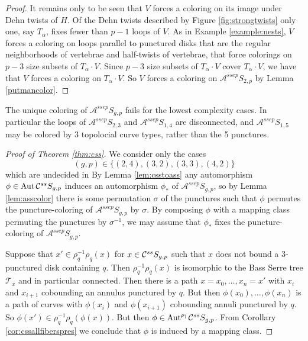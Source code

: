 \begin{proof}
It remains only to be seen that $V$ forces a coloring on its image under Dehn twists of $H$.
Of the Dehn twists described by Figure \ref{fig:strongtwists}
only one, say $T_\alpha$, fixes fewer than $p-1$ loops of $V$.
As in Example \ref{example:nests}, $V$ forces a coloring on loops parallel to punctured
disks that are the regular neighborhoods of vertebrae and half-twists of vertebrae,
that force colorings on $p-3$ size subsets of $T_\alpha \cdot V$.
Since $p-3$ size subsets of $T_\alpha \cdot V$ cover $T_\alpha \cdot V$,
we have that $V$ forces a coloring on $T_\alpha \cdot V$.
So $V$ forces a coloring on $\mathcal A^{ssep} S_{2,p}$ by Lemma \ref{putmancolor}.

\end{proof}



\begin{remark}
  The unique coloring of
  $\mathcal A^{ssep}  S_{g,p}$ fails for the lowest complexity cases.
  In particular the loops of $\mathcal A^{ssep}  S_{2,3}$ and
  $\mathcal A^{ssep}  S_{1,4}$ are disconnected,
  and $\mathcal A^{ssep}  S_{1,5}$ may be colored by 3 topolocial curve types, rather
  than the 5 punctures.
\end{remark}

\begin{proof}[Proof of Theorem \ref{thm:css}]
  We consider only the cases
  $$(g,p) \in \{(2,4),(3,2),(3,3),(4,2)\}$$
  which are undecided in \cite{bowditch}
  By Lemma \ref{lem:csstoass}
  any automorphism $\phi \in \operatorname{Aut}  \mathcal C^{{ss}}  S_{g,p}$
  induces an automorphism $\phi_\ast$ of $\mathcal A^{ssep} S_{g,p}$,
  so by Lemma \ref{lem:asscolor} there is some permutation $\sigma$ of the punctures such that $\phi$
  permutes the puncture-coloring of $\mathcal A^{ssep} S_{g,p}$ by $\sigma$.
  By composing $\phi$ with a mapping class permuting the punctures by $\sigma^{-1}$,
  we may assume that $\phi_\ast$ fixes the puncture-coloring of $\mathcal A^{ssep} S_{g,p}$.

  Suppose that $x' \in \rho_q^{-1} \rho_q (x)$ for $x \in  \mathcal C^{{ss}}  S_{g,p}$ such that $x$ does not bound a 3-punctured disk containing $q$.
  Then $\rho_q^{-1} \rho_q(x)$ is isomorphic to the Bass Serre tree $\mathcal T_x$
  and in particular connected.
  Then there is a path $x=x_0,\ldots,x_n=x'$ with $x_i$ and $x_{i+1}$ cobounding an annulus punctured by $q$.
  But then $\phi(x_0),\ldots,\phi(x_n)$ is a path of curves with $\phi(x_i)$ and $\phi(x_{i+1})$ cobounding annuli punctured by $q$.
  So $\phi(x') \in \rho_q^{-1} \rho_q( \phi(x))$.
  But then $\phi \in \operatorname{Aut}^{\rho_|}  \mathcal C^{{ss}}  S_{g,p}$.
  From Corollary \ref{cor:cssallfiberspres} we conclude that $\phi$ is induced by a mapping class.
\end{proof}

